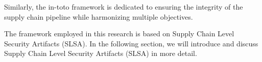 Similarly, the in-toto framework is dedicated to ensuring the integrity of the supply 
chain pipeline while harmonizing multiple objectives.

The framework employed in this research is based on Supply Chain Level Security 
Artifacts (SLSA). In the following section, we will introduce and discuss Supply Chain 
Level Security Artifacts (SLSA) in more detail.
